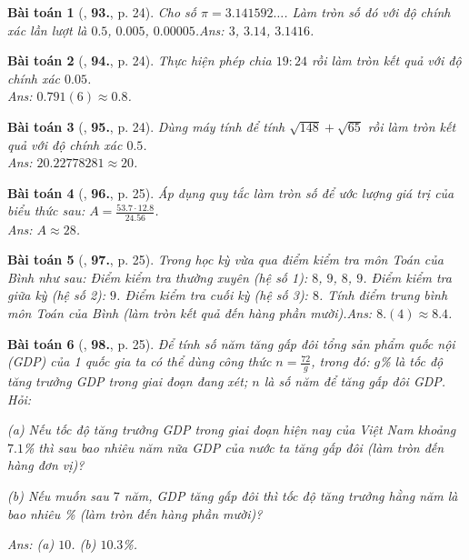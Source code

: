 \documentclass{article}
\numberwithin{equation}{section}
\newtheorem{baitoan}{Bài toán}
\begin{document}
\begin{baitoan}[\cite{Tuyen_Toan_7}, \textbf{93.}, p. 24]
	Cho số $\pi = 3.141592\ldots$. Làm tròn số đó với độ chính xác lần lượt là $0.5$, $0.005$, $0.00005$.\hfill{\sf Ans:} $3$, $3.14$, $3.1416$.
\end{baitoan}

\begin{baitoan}[\cite{Tuyen_Toan_7}, \textbf{94.}, p. 24]
	Thực hiện phép chia $19:24$ rồi làm tròn kết quả với độ chính xác $0.05$.\\\mbox{}\hfill{\sf Ans:} $0.791(6)\approx0.8$.
\end{baitoan}

\begin{baitoan}[\cite{Tuyen_Toan_7}, \textbf{95.}, p. 24]
	Dùng máy  tính để tính $\sqrt{148} + \sqrt{65}$ rồi làm tròn kết quả với độ chính xác $0.5$.\\\mbox{}\hfill{\sf Ans:} $20.22778281\approx20$.
\end{baitoan}

\begin{baitoan}[\cite{Tuyen_Toan_7}, \textbf{96.}, p. 25]
	Áp dụng quy tắc làm tròn số để ước lượng giá trị của biểu thức sau: $A = \frac{53.7\cdot 12.8}{24.56}$.\\\mbox{}\hfill{\sf Ans:} $A\approx 28$.
\end{baitoan}

\begin{baitoan}[\cite{Tuyen_Toan_7}, \textbf{97.}, p. 25]
	Trong học kỳ vừa qua điểm kiểm tra môn Toán của Bình như sau: Điểm kiểm tra thường xuyên (hệ số 1): $8$, $9$, $8$, $9$. Điểm kiểm tra giữa kỳ (hệ số 2): $9$. Điểm kiểm tra cuối kỳ (hệ số 3): $8$. Tính điểm trung bình môn Toán của Bình (làm tròn kết quả đến hàng phần mười).\hfill{\sf Ans:} $8.(4)\approx8.4$.
\end{baitoan}

\begin{baitoan}[\cite{Tuyen_Toan_7}, \textbf{98.}, p. 25]
	Để tính số năm tăng gấp đôi tổng sản phẩm quốc nội (GDP) của 1 quốc gia ta có thể dùng công thức $n = \frac{72}{g}$, trong đó: $g$\% là \emph{tốc độ tăng trưởng GDP} trong giai đoạn đang xét; $n$ là số năm để tăng gấp đôi GDP. Hỏi:
	\begin{enumerate*}
		\item[(a)] Nếu tốc độ tăng trưởng GDP trong giai đoạn hiện nay của Việt Nam khoảng $7.1$\% thì sau bao nhiêu năm nữa GDP của nước ta tăng gấp đôi (làm tròn đến hàng đơn vị)?
		\item[(b)] Nếu muốn sau $7$ năm, GDP tăng gấp đôi thì tốc độ tăng trưởng hằng năm là bao nhiêu \% (làm tròn đến hàng phần mười)?
	\end{enumerate*}\hfill{\sf Ans:} (a) $10$. (b) $10.3$\%.
\end{baitoan}
\end{document}
